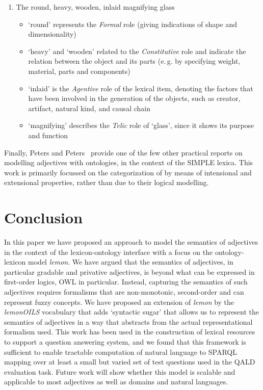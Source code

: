 \documentclass[11pt]{article}
\begin{document}
\begin{enumerate}
\item The round, heavy, wooden, inlaid magnifying glass \label{ex:qualia}
\begin{itemize}[noitemsep]
\item `round' represents the \textit{Formal} role (giving indications of shape and dimensionality)
\item `heavy' and `wooden' related to the \textit{Constitutive} role and indicate the relation between the object and its parts (e.\,g. by specifying weight, material, parts and components)
\item `inlaid' is the \textit{Agentive} role of the lexical item, denoting the factors that have been involved in the generation of the objects, such as creator, artifact, natural kind, and causal chain
\item `magnifying' describes the \textit{Telic} role of `glass', since it shows its purpose and function
\end{itemize}
\end{enumerate}

Finally, Peters and Peters~ provide one of the few other practical reports on modelling adjectives with ontologies, in the context of the SIMPLE lexica. This work is primarily focussed on the categorization of by means of intensional and extensional properties, rather than due to their logical modelling. 

\section{Conclusion}

In this paper we have proposed an approach to model the semantics of adjectives in the context 
of the lexicon-ontology interface with a focus on the ontology-lexicon model \emph{lemon}. We have argued that the semantics of adjectives, in particular gradable and privative adjectives, is beyond what can be expressed in first-order logics, OWL in particular. Instead, capturing the semantics of such adjectives requires formalisms that are non-monotonic, second-order and can represent fuzzy concepts. We have proposed an extension of \emph{lemon} by the \emph{lemonOILS} vocabulary that adds `syntactic sugar' that allows us to represent the semantics of adjectives in a way that abstracts from the actual representational formalism used. This work has been used in the construction of lexical resources to support
a question answering system, and we found that this framework is sufficient to enable
tractable computation of natural language to SPARQL mapping over at least a small
but varied set of test questions used in the QALD evaluation task.
Future work will show whether this model is scalable and applicable to most adjectives as well as domains and natural languages.





\end{document}
